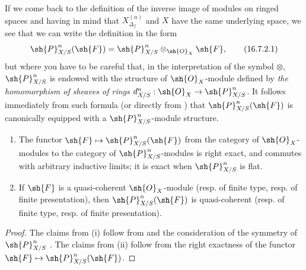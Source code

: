 \begin{env}[16.7.2]
\label{IV.16.7.2}
If we come back to the definition of the inverse image of modules on ringed spaces  and having in mind that $X_{\Delta_f}^{(n)}$ and $X$ have the same underlying space, we see that we can write the definition  in the form
\[
  \label{IV.16.7.2.1}
  \sh{P}_{X/S}^n(\sh{F}) = \sh{P}_{X/S}^n \otimes_{\sh{O}_X} \sh{F},
  \tag{16.7.2.1}
\]
but where you have to be careful that, in the interpretation of the symbol $\otimes$, $\sh{P}_{X/S}^n$ is endowed with the structure of $\sh{O}_X$-module defined by \emph{the homomorphism of sheaves of rings $d_{X/S}^n:\sh{O}_X \to \sh{P}_{X/S}^n$}.
It follows immediately from such formula (or directly from ) that $\sh{P}_{X/S}^n(\sh{F})$ is canonically equipped with a $\sh{P}_{X/S}^n$-module structure. 
\end{env}

\begin{proposition}[16.7.3]
\label{IV.16.7.3}
\begin{enumerate}
  \item[\rm{(i)}] The functor $\sh{F} \mapsto \sh{P}_{X/S}^n(\sh{F})$ from the category of $\sh{O}_X$-modules to the category of $\sh{P}_{X/S}^n$-modules is right exact, and commutes with arbitrary inductive limits;
  it is exact when $\sh{P}_{X/S}^n$ is flat.
  \item[\rm{(ii)}] If $\sh{F}$ is a quasi-coherent $\sh{O}_X$-module (resp. of finite type, resp. of finite presentation), then $\sh{P}_{X/S}^n(\sh{F})$ is quasi-coherent (resp. of finite type, resp. of finite presentation).
\end{enumerate}
\end{proposition}

\begin{proof}
The claims from \rm{(i)} follow from  and the consideration of the symmetry of $\sh{P}_{X/S}^n$ .
The claims from \rm{(ii)} follow from the right exactness of the functor $\sh{F} \mapsto \sh{P}_{X/S}^n(\sh{F})$.
\end{proof}

